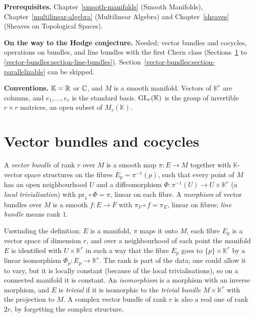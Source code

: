 \noindent\textbf{Prerequisites.} Chapter~\ref{smooth-manifolds} (Smooth Manifolds), Chapter~\ref{multilinear-algebra} (Multilinear Algebra) and Chapter~\ref{sheaves} (Sheaves on
Topological Spaces).

\noindent\textbf{On the way to the Hodge conjecture.} Needed: vector bundles and cocycles, operations on bundles, and line bundles with the first Chern class (Sections~\ref{vector-bundles:section-definition} to \ref{vector-bundles:section-line-bundles}).
Section~\ref{vector-bundles:section-parallelizable} can be skipped.

\noindent\textbf{Conventions.} $\mathbb{K} = \mathbb{R}$ or $\mathbb{C}$, and $M$ is a smooth manifold. Vectors of $\mathbb{K}^r$ are columns, and $e_1, \ldots, e_r$ is the standard basis.
$\mathrm{GL}_r(\mathbb{K})$ is the group of invertible $r \times r$ matrices, an open subset of $M_r(\mathbb{K})$.

\section{Vector bundles and cocycles}\label{vector-bundles:section-definition}

\begin{definition}\label{vector-bundles:definition-vector-bundle}
A \emph{vector bundle} of rank $r$ over $M$ is a smooth map $\pi \colon E \to M$ together with $\mathbb{K}$-vector space structures on the fibres $E_p = \pi^{-1}(p)$, such that every point of $M$ has an open
neighbourhood $U$ and a diffeomorphism $\Phi \colon \pi^{-1}(U) \to U \times \mathbb{K}^r$ (a \emph{local trivialisation}) with $\mathrm{pr}_1 \circ \Phi = \pi$, linear on each fibre. A \emph{morphism} of vector
bundles over $M$ is a smooth $f \colon E \to F$ with $\pi_F \circ f = \pi_E$, linear on fibres; \emph{line bundle} means rank $1$.
\end{definition}

Unwinding the definition: $E$ is a manifold, $\pi$ maps it onto $M$, each fibre $E_p$ is a vector space of dimension $r$, and over a neighbourhood of each point the manifold $E$
is identified with $U \times \mathbb{K}^r$ in such a way that the fibre $E_p$ goes to $\{p\} \times \mathbb{K}^r$ by a linear isomorphism $\Phi_p \colon E_p \to \mathbb{K}^r$.
The rank is part of the data; one could allow it to vary, but it is locally constant (because of the local trivialisations), so on a connected manifold it is constant. An
\emph{isomorphism} is a morphism with an inverse morphism, and $E$ is \emph{trivial} if it is isomorphic to the \emph{trivial bundle} $M \times \mathbb{K}^r$ with the projection
to $M$. A complex vector bundle of rank $r$ is also a real one of rank $2r$, by forgetting the complex structure.

